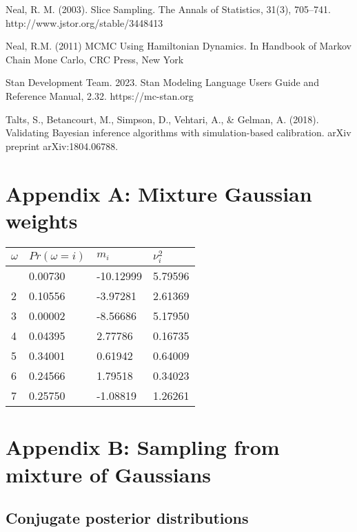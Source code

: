 \documentclass[
  12pt,
  letterpaper,
  DIV=11,
  numbers=noendperiod]{scrartcl}
\begin{document}
Neal, R. M. (2003). Slice Sampling. The Annals of Statistics, 31(3),
705--741. http://www.jstor.org/stable/3448413

Neal, R.M. (2011) MCMC Using Hamiltonian Dynamics. In Handbook of Markov
Chain Mone Carlo, CRC Press, New York

Stan Development Team. 2023. Stan Modeling Language Users Guide and
Reference Manual, 2.32. https://mc-stan.org

Talts, S., Betancourt, M., Simpson, D., Vehtari, A., \& Gelman, A.
(2018). Validating Bayesian inference algorithms with simulation-based
calibration. arXiv preprint arXiv:1804.06788.

\newpage{}

\hypertarget{appendix-a-mixture-gaussian-weights}{%
\section{Appendix A: Mixture Gaussian
weights}\label{appendix-a-mixture-gaussian-weights}}

\begin{longtable}[]{@{}llll@{}}
\toprule\noalign{}
\(\omega\) & \(Pr(\omega = i)\) & \(m_i\) & \(\nu^2_i\) \\
\midrule\noalign{}
\endhead
\bottomrule\noalign{}
\endlastfoot
1 & 0.00730 & -10.12999 & 5.79596 \\
2 & 0.10556 & -3.97281 & 2.61369 \\
3 & 0.00002 & -8.56686 & 5.17950 \\
4 & 0.04395 & 2.77786 & 0.16735 \\
5 & 0.34001 & 0.61942 & 0.64009 \\
6 & 0.24566 & 1.79518 & 0.34023 \\
7 & 0.25750 & -1.08819 & 1.26261 \\
\end{longtable}

\newpage{}

\hypertarget{appendix-b-sampling-from-mixture-of-gaussians}{%
\section{Appendix B: Sampling from mixture of
Gaussians}\label{appendix-b-sampling-from-mixture-of-gaussians}}

\hypertarget{conjugate-posterior-distributions}{%
\subsection{Conjugate posterior
distributions}\label{conjugate-posterior-distributions}}
\end{document}
